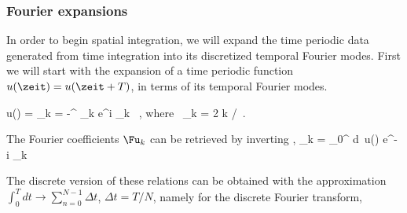\subsubsection{Fourier expansions}
\label{sect:MNGspatFourier}

In order to begin spatial integration, we will expand the time periodic data generated from time integration into its discretized temporal Fourier modes. First we will start with the expansion of a time periodic function $u(\zeit) = u(\zeit + T)$, in terms of its temporal Fourier modes.

\beq
    u(\zeit) = \sum_{k = -\infty}^{\infty}
    \Fu_k e^{i \omega_k \zeit} \, , \quad \mbox{where }
    \omega_k = 2 \pi k / \period{}
\,.
\label{e-MNGre6}
\eeq

The Fourier coefficients $\Fu_k$ can be retrieved by inverting ,
\beq
    \Fu_k =  \int_0^{\period{}} d\zeit\ u(\zeit)
            e^{- i \omega_k \zeit}
            \label{e-MNGre7}
\eeq

The discrete version of these relations can be obtained with the approximation $\int_0^T dt \rightarrow \sum_{n=0}^{N-1}\Delta t$, $\Delta t ={T}/{N} $, namely for the discrete Fourier transform,

